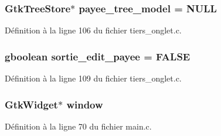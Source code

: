 \subsubsection[{payee\_\-tree\_\-model}]{\setlength{\rightskip}{0pt plus 5cm}GtkTreeStore$\ast$ {\bf payee\_\-tree\_\-model} = NULL}\label{tiers__onglet_8c_a1621c167eb13470254518b600d2983bf}


Définition à la ligne 106 du fichier tiers\_\-onglet.c.

\subsubsection[{sortie\_\-edit\_\-payee}]{\setlength{\rightskip}{0pt plus 5cm}gboolean {\bf sortie\_\-edit\_\-payee} = FALSE}\label{tiers__onglet_8c_ae51d7336b51ccdb5727c3e33cf79e7ea}


Définition à la ligne 109 du fichier tiers\_\-onglet.c.

\subsubsection[{window}]{\setlength{\rightskip}{0pt plus 5cm}GtkWidget$\ast$ {\bf window}}\label{tiers__onglet_8c_a3d346c08cf2d67c388caabffb412b293}


Définition à la ligne 70 du fichier main.c.

